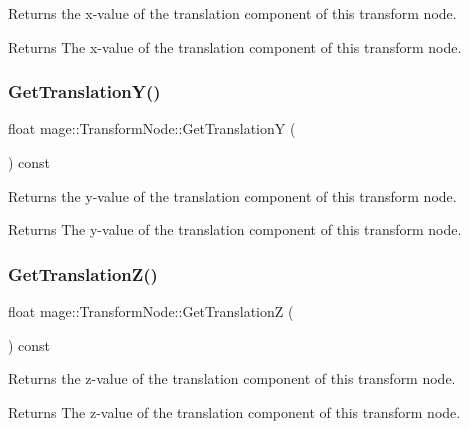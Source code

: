 Returns the x-\/value of the translation component of this transform node.

\begin{DoxyReturn}{Returns}
The x-\/value of the translation component of this transform node. 
\end{DoxyReturn}
\hypertarget{classmage_1_1_transform_node_a0a4d107bb131f23f599ada568d10a330}{}\label{classmage_1_1_transform_node_a0a4d107bb131f23f599ada568d10a330} 
\subsubsection{\texorpdfstring{Get\+Translation\+Y()}{GetTranslationY()}}
{\footnotesize\ttfamily float mage\+::\+Transform\+Node\+::\+Get\+TranslationY (\begin{DoxyParamCaption}{ }\end{DoxyParamCaption}) const}

Returns the y-\/value of the translation component of this transform node.

\begin{DoxyReturn}{Returns}
The y-\/value of the translation component of this transform node. 
\end{DoxyReturn}
\hypertarget{classmage_1_1_transform_node_a0f7a78d289c16750e01ceefda0dea480}{}\label{classmage_1_1_transform_node_a0f7a78d289c16750e01ceefda0dea480} 
\subsubsection{\texorpdfstring{Get\+Translation\+Z()}{GetTranslationZ()}}
{\footnotesize\ttfamily float mage\+::\+Transform\+Node\+::\+Get\+TranslationZ (\begin{DoxyParamCaption}{ }\end{DoxyParamCaption}) const}

Returns the z-\/value of the translation component of this transform node.

\begin{DoxyReturn}{Returns}
The z-\/value of the translation component of this transform node. 
\end{DoxyReturn}
\hypertarget{classmage_1_1_transform_node_af6b6c54f0115a3423d9f6955df236878}{}\label{classmage_1_1_transform_node_af6b6c54f0115a3423d9f6955df236878} 
